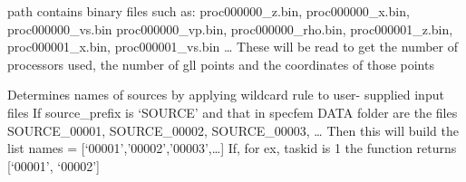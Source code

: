 \documentclass[letterpaper,10pt,english]{sphinxmanual}
\begin{document}
\begin{fulllineitems}
\begin{fulllineitems}
\label{\detokenize{ref/seisflows.solver:seisflows.solver.base.base.check_mesh_properties}}
path contains binary files such as:
proc000000\_z.bin, proc000000\_x.bin, proc000000\_vs.bin
proc000000\_vp.bin, proc000000\_rho.bin, proc000001\_z.bin,
proc000001\_x.bin, proc000001\_vs.bin …
These will be read to get the number of processors used, the number
of gll points and the coordinates of those points

\end{fulllineitems}


\begin{fulllineitems}
\label{\detokenize{ref/seisflows.solver:seisflows.solver.base.base.check_solver_parameter_files}}
\end{fulllineitems}


\begin{fulllineitems}
\label{\detokenize{ref/seisflows.solver:seisflows.solver.base.base.check_source_names}}
Determines names of sources by applying wildcard rule to user-
supplied input files
If source\_prefix is ‘SOURCE’ and that in specfem DATA folder are
the files SOURCE\_00001, SOURCE\_00002, SOURCE\_00003, …
Then this will build the list names = {[}‘00001’,’00002’,’00003’,…{]}
If, for ex, taskid is 1 the function returns {[}‘00001’, ‘00002’{]}

\end{fulllineitems}


\begin{fulllineitems}
\label{\detokenize{ref/seisflows.solver:seisflows.solver.base.base.clean}}
\end{fulllineitems}


\end{fulllineitems}
\end{document}
